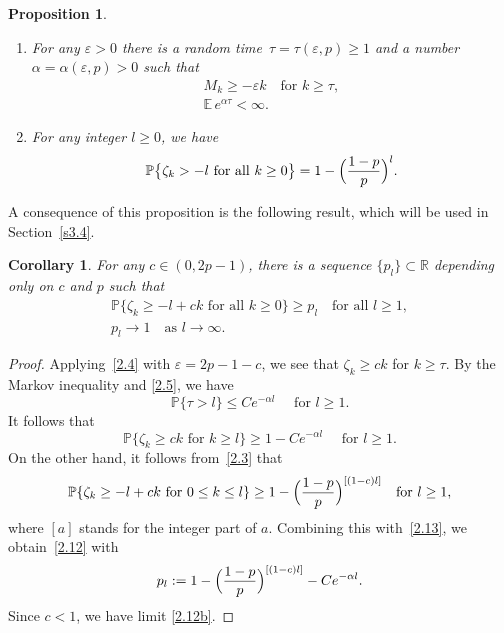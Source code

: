 \documentclass[11pt]{article}
\newcommand{\skpt}{\smallskip}
\theoremstyle{plain}
\newtheorem{proposition}[theorem]{Proposition}
\newtheorem{corollary}[theorem]{Corollary}
\theoremstyle{definition}
\newenvironment{enumeratea}
{\bgroup\def\theenumi{\alph{enumi}}\begin{enumerate}}
{\end{enumerate}\egroup}
\theoremstyle{plain}
\numberwithin{equation}{section}
\let\e\varepsilon
\let\ty\infty
\newcommand{\R}{{\mathbb R}}
\newcommand{\IP}{{\mathbb P}}
\newcommand{\E}{{\mathbb E}}
\begin{document}
\skpt
\begin{proposition} \label{p2.1}
\begin{enumeratea}
\item
For any $\e\!>\!0$ there is a random time~$\tau\!=\!\tau(\e,p)\!\ge\!1$ and a number \hbox{$\alpha\!=\!\alpha(\e,p)\!>\!0$} such that
\begin{gather}
M_k\ge -\e k\quad\text{for $k\ge\tau$},\label{2.4}\\
\E \,e^{\alpha\tau}<\infty. \label{2.5}
\end{gather}

\item
For any integer $l\ge0$, we have
\begin{equation}\label{2.3}
\IP\bigl\{\zeta_k> -l\text{ for all }k\ge0\bigr\}=1-\Bigl(\dfrac{1-p}{p}\Bigr)^l.
\end{equation}
\end{enumeratea}
\end{proposition}

A consequence of this proposition is the following result, which will be used in Section~\ref{s3.4}.

\begin{corollary} \label{c2.2}
For any $c\in(0,2p-1)$, there is a sequence $\{p_l\}\subset \R$ depending only on $c$ and $p$ such that
\begin{gather}
\IP\{\zeta_k\ge -l+ck\text{ for all $k\ge0$}\}\ge p_l \quad \text{for all $l\ge1$},\label{2.12}\\
p_l\to 1 \quad \text{as $l\to \ty$}. \label{2.12b}
\end{gather}
\end{corollary}
\begin{proof}
Applying~\eqref{2.4} with $\e=2p-1-c$, we see that $\zeta_k\ge ck$ for $k\ge \tau$.
By the Markov inequality and \eqref{2.5}, we have
\[
\IP\{\tau>l\}\le C e^{-\alpha l} \quad\text{ for $l\ge1$}.
\]
It follows that
\begin{equation} \label{2.13}
\IP\{\zeta_k\ge ck\text{ for $k\ge l$}\}\ge 1-C e^{-\alpha l}\quad\text{ for $l\ge1$}.
\end{equation}
On the other hand, it follows from~\eqref{2.3} that
\[
\IP\{\zeta_k\ge -l+ck\text{ for $0\le k\le l$}\}\ge1- \Bigl(\dfrac{1-p}{p}\Bigr)^{[(1-c)l]}
\quad \text{for $l\ge1$},
\]
where $[a]$ stands for the integer part of $a$. Combining this with~\eqref{2.13}, we obtain~\eqref{2.12} with
\[
p_l:=1- \Bigl(\dfrac{1-p}{p}\Bigr)^{[(1-c)l]} -C e^{-\alpha l}.
\]
Since $c<1$, we have limit \eqref{2.12b}.
\end{proof}
\end{document}
